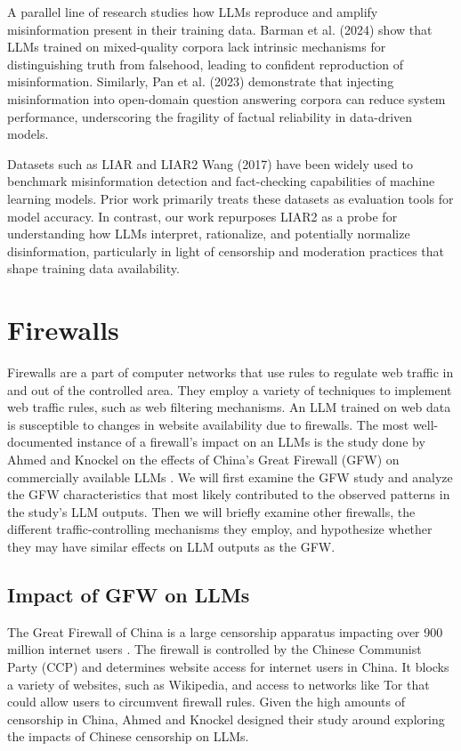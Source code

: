 \documentclass[conference=acm]{confpaper}
\begin{document}
A parallel line of research studies how LLMs reproduce and amplify misinformation present in their training data. Barman et al. (2024) \cite{Barman} show that LLMs trained on mixed-quality corpora lack intrinsic mechanisms for distinguishing truth from falsehood, leading to confident reproduction of misinformation. Similarly, Pan et al. (2023) \cite{Pan} demonstrate that injecting misinformation into open-domain question answering corpora can reduce system performance, underscoring the fragility of factual reliability in data-driven models.

Datasets such as LIAR and LIAR2 Wang (2017) \cite{Wang} have been widely used to benchmark misinformation detection and fact-checking capabilities of machine learning models. Prior work primarily treats these datasets as evaluation tools for model accuracy. In contrast, our work repurposes LIAR2 as a probe for understanding how LLMs interpret, rationalize, and potentially normalize disinformation, particularly in light of censorship and moderation practices that shape training data availability.


\section{Firewalls}

Firewalls are a part of computer networks that use rules to regulate web traffic in and out of the controlled area. They employ a variety of techniques to implement web traffic rules, such as web filtering mechanisms. An LLM trained on web data is susceptible to changes in website availability due to firewalls. The most well-documented instance of a firewall's impact on an LLMs is the study done by Ahmed and Knockel on the effects of China's Great Firewall (GFW) on commercially available LLMs \cite{Ahmed}. We will first examine the GFW study and analyze the GFW characteristics that most likely contributed to the observed patterns in the study's LLM outputs. Then we will briefly examine other firewalls, the different traffic-controlling mechanisms they employ, and hypothesize whether they may have similar effects on LLM outputs as the GFW.

\subsection{Impact of GFW on LLMs}

The Great Firewall of China is a large censorship apparatus impacting over 900 million internet users \cite{Quan}. The firewall is controlled by the Chinese Communist Party (CCP) and determines website access for internet users in China. It blocks a variety of websites, such as Wikipedia, and access to networks like Tor that could allow users to circumvent firewall rules. Given the high amounts of censorship in China, Ahmed and Knockel designed their study around exploring the impacts of Chinese censorship on LLMs.
\end{document}
